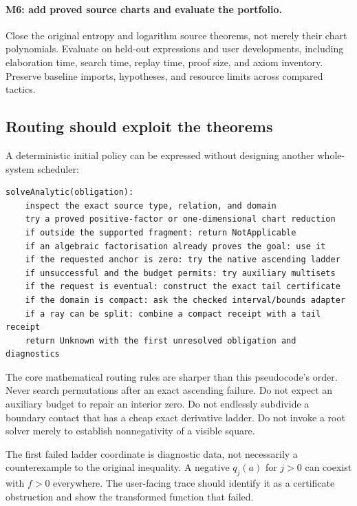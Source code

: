 \paragraph{M6: add proved source charts and evaluate the portfolio.}
Close the original entropy and logarithm source theorems, not merely their
chart polynomials. Evaluate on held-out expressions and user developments,
including elaboration time, search time, replay time, proof size, and axiom
inventory. Preserve baseline imports, hypotheses, and resource limits across
compared tactics.

\subsection{Routing should exploit the theorems}

A deterministic initial policy can be expressed without designing another
whole-system scheduler:
\par\noindent\begin{minipage}{\linewidth}
\begin{lstlisting}
solveAnalytic(obligation):
    inspect the exact source type, relation, and domain
    try a proved positive-factor or one-dimensional chart reduction
    if outside the supported fragment: return NotApplicable
    if an algebraic factorisation already proves the goal: use it
    if the requested anchor is zero: try the native ascending ladder
    if unsuccessful and the budget permits: try auxiliary multisets
    if the request is eventual: construct the exact tail certificate
    if the domain is compact: ask the checked interval/bounds adapter
    if a ray can be split: combine a compact receipt with a tail receipt
    return Unknown with the first unresolved obligation and diagnostics
\end{lstlisting}
\end{minipage}\par

The core mathematical routing rules are sharper than this pseudocode's order.
Never search permutations after an exact ascending failure. Do not expect an
auxiliary budget to repair an interior zero. Do not endlessly subdivide a
boundary contact that has a cheap exact derivative ladder. Do not invoke a
root solver merely to establish nonnegativity of a visible square.

The first failed ladder coordinate is diagnostic data, not necessarily a
counterexample to the original inequality. A negative $q_j(a)$ for $j>0$ can
coexist with $f>0$ everywhere. The user-facing trace should identify it as a
certificate obstruction and show the transformed function that failed.

